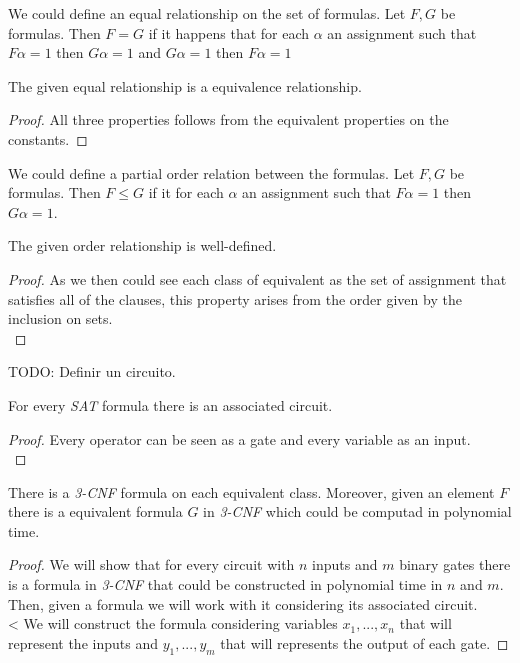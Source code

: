 \begin{definition}
    We could define an equal relationship on the set of formulas. Let $F,G$ be formulas. Then $F= G$ if it happens that for each $\alpha$ an assignment such that $F\alpha = 1$ then $G\alpha = 1$ and $G\alpha = 1$ then $F\alpha = 1$

    \begin{proposition} 
      The given equal relationship is a equivalence relationship.
    \end{proposition}
    \begin{proof}
      All three properties follows from the equivalent properties on the constants.

    \end{proof}
    
    
    We could define a partial order relation between the formulas.	Let $F,G$ be formulas. Then $F\le G$ if it for each $\alpha$ an assignment such that $F\alpha = 1$ then $G\alpha = 1$. \\
    
    
    \begin{proposition} 
      The given order relationship is well-defined.
    \end{proposition}
    \begin{proof}
      As we then could see each class of equivalent as the set of assignment that satisfies all of the clauses, this property arises from the order given by the inclusion on sets.\\
    \end{proof}


    TODO: Definir un circuito.
    
    \begin{lemma}
      For every \emph{SAT} formula there is an associated circuit.
    \end{lemma}
    \begin{proof}
      Every operator can be seen as a gate and every variable as an input.\\
    \end{proof}
    
    \begin{theorem}
      There is a \emph{3-CNF} formula on each equivalent class. Moreover, given an element $F$  there is a equivalent formula $G$  in \emph{3-CNF} which could be computad in polynomial time. 
    \end{theorem}

    \begin{proof}
      We will show that for every circuit with $n$ inputs and $m$ binary gates there is a formula in \emph{3-CNF}  that could be constructed in polynomial time in $n$ and $m$. Then, given a formula we will work with it considering its associated circuit.\\
<
      We will construct the formula considering variables $x_1,...,x_n$ that will represent the inputs and $y_1,...,y_m$ that will represents the output of each gate. 


\end{proof}
\end{definition}
